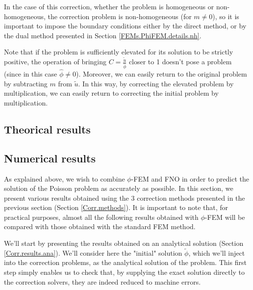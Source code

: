 In the case of this correction, whether the problem is homogeneous or non-homogeneous, the correction problem is non-homogeneous (for $m\ne 0$), so it is important to impose the boundary conditions either by the direct method, or by the dual method presented in Section \ref{FEMs.PhiFEM.details.nh}.


\begin{Rem}
	Note that if the problem is sufficiently elevated for its solution to be strictly positive, the operation of bringing $C=\frac{\tilde{u}}{\hat{\phi}}$ closer to 1 doesn't pose a problem (since in this case $\hat{\phi}\ne 0$). Moreover, we can easily return to the original problem by subtracting $m$ from $\tilde{u}$. In this way, by correcting the elevated problem by multiplication, we can easily return to correcting the initial problem by multiplication. 
\end{Rem}

\subsection{Theorical results} \label{Corr.theo_results}

 

\subsection{Numerical results} \label{Corr.results}

As explained above, we wish to combine $\phi$-FEM and FNO in order to predict the solution of the Poisson problem as accurately as possible. In this section, we present various results obtained using the 3 correction methods presented in the previous section (Section \ref{Corr.methods}). It is important to note that, for practical purposes, almost all the following results obtained with $\phi$-FEM will be compared with those obtained with the standard FEM method.

We'll start by presenting the results obtained on an analytical solution (Section \ref{Corr.results.ana}). We'll consider here the "initial" solution $\tilde{\phi}$, which we'll inject into the correction problems, as the analytical solution of the problem. This first step simply enables us to check that, by supplying the exact solution directly to the correction solvers, they are indeed reduced to machine errors.

